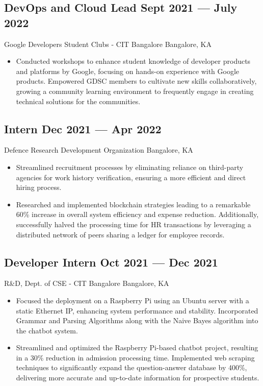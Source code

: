 \documentclass[a4,10pt]{article}
\newcommand{\subtext}[1]{
#1\par\vspace{-0.2cm}}
\newenvironment{zitemize}{
\begin{itemize}\itemsep0pt \parskip0pt \parsep1pt}
{\end{itemize}\vspace{-0.5cm}}
\begin{document}
\subsection*{DevOps and Cloud Lead \hfill Sept 2021 --- July 2022} 
\subtext{Google Developers Student Clubs - CIT Bangalore \hfill Bangalore, KA} 
    \begin{zitemize}
        \item Conducted workshops to enhance student knowledge of developer products and platforms by Google, focusing on hands-on experience with Google products. Empowered GDSC members to cultivate new skills collaboratively, growing a community learning environment to frequently engage in creating technical solutions for the communities.
    \end{zitemize}
    

\subsection*{Intern \hfill Dec 2021 --- Apr 2022} 
\subtext{Defence Research Development Organization \hfill Bangalore, KA} 
    \begin{zitemize}
        \item Streamlined recruitment processes by eliminating reliance on third-party agencies for work history verification, ensuring a more efficient and direct hiring process.
        \item Researched and implemented blockchain strategies leading to a remarkable 60\% increase in overall system efficiency and expense reduction. Additionally, successfully halved the processing time for HR transactions by leveraging a distributed network of peers sharing a ledger for employee records.
    \end{zitemize}
    
\subsection*{Developer Intern \hfill Oct 2021 --- Dec 2021} 
\subtext{R\&D, Dept. of CSE - CIT Bangalore \hfill Bangalore, KA} 
    \begin{zitemize}
        \item Focused the deployment on a Raspberry Pi using an Ubuntu server with a static Ethernet IP, enhancing system performance and stability. Incorporated Grammar and Parsing Algorithms along with the Naive Bayes algorithm into the chatbot system. 
        \item Streamlined and optimized the Raspberry Pi-based chatbot project, resulting in a 30\% reduction in admission processing time. Implemented web scraping techniques to significantly expand the question-answer database by 400\%, delivering more accurate and up-to-date information for prospective students.
    \end{zitemize}
\end{document}
